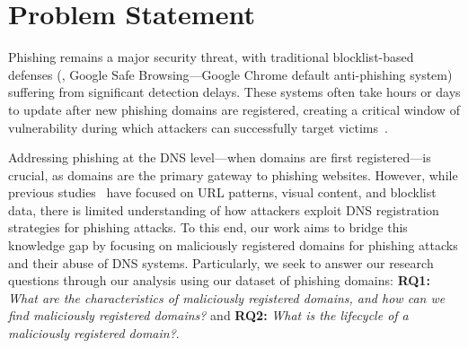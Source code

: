 \section{Problem Statement}
\label{sec:motivation}



Phishing remains a major security threat, with traditional blocklist-based defenses (\eg, Google Safe Browsing---Google Chrome default anti-phishing system) suffering from significant detection delays. These systems often take hours or days to update after new phishing domains are registered, creating a critical window of vulnerability during which attackers can successfully target victims~\cite{lin2021phishpedia,liu2022inferring,liu2023knowledge,liu2024less,oest2019phishfarm,oest2020phishtime}.

Addressing phishing at the DNS level---when domains are first registered---is crucial, as domains are the primary gateway to phishing websites. However, while previous studies~\cite{maroofi2020comar,moura2024characterizing,hao2013understanding,oest2019phishfarm,oest2020phishtime,oest2020sunrise}  have focused on URL patterns, visual content, and blocklist data, there is limited understanding of how attackers exploit DNS registration strategies for phishing attacks.
To this end, our work aims to bridge this knowledge gap by focusing on maliciously registered domains for phishing attacks and their abuse of DNS systems. 
Particularly, we seek to answer our research questions through our analysis using our dataset of phishing domains: 
\textbf{RQ1:} \textit{What are the characteristics of maliciously registered domains, and how can we find maliciously registered domains?} and 
\textbf{RQ2:} \textit{What is the lifecycle of a maliciously registered domain?}.

